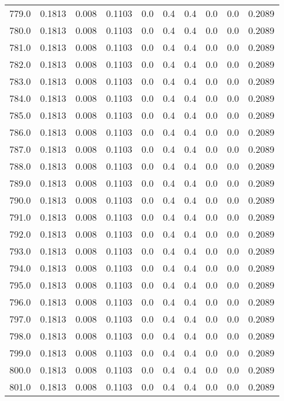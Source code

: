 \begin{longtable}{lrrrrrrrrr}
779.0 & 0.1813 & 0.008 & 0.1103 & 0.0 & 0.4 & 0.4 & 0.0 & 0.0 & 0.2089 \\
780.0 & 0.1813 & 0.008 & 0.1103 & 0.0 & 0.4 & 0.4 & 0.0 & 0.0 & 0.2089 \\
781.0 & 0.1813 & 0.008 & 0.1103 & 0.0 & 0.4 & 0.4 & 0.0 & 0.0 & 0.2089 \\
782.0 & 0.1813 & 0.008 & 0.1103 & 0.0 & 0.4 & 0.4 & 0.0 & 0.0 & 0.2089 \\
783.0 & 0.1813 & 0.008 & 0.1103 & 0.0 & 0.4 & 0.4 & 0.0 & 0.0 & 0.2089 \\
784.0 & 0.1813 & 0.008 & 0.1103 & 0.0 & 0.4 & 0.4 & 0.0 & 0.0 & 0.2089 \\
785.0 & 0.1813 & 0.008 & 0.1103 & 0.0 & 0.4 & 0.4 & 0.0 & 0.0 & 0.2089 \\
786.0 & 0.1813 & 0.008 & 0.1103 & 0.0 & 0.4 & 0.4 & 0.0 & 0.0 & 0.2089 \\
787.0 & 0.1813 & 0.008 & 0.1103 & 0.0 & 0.4 & 0.4 & 0.0 & 0.0 & 0.2089 \\
788.0 & 0.1813 & 0.008 & 0.1103 & 0.0 & 0.4 & 0.4 & 0.0 & 0.0 & 0.2089 \\
789.0 & 0.1813 & 0.008 & 0.1103 & 0.0 & 0.4 & 0.4 & 0.0 & 0.0 & 0.2089 \\
790.0 & 0.1813 & 0.008 & 0.1103 & 0.0 & 0.4 & 0.4 & 0.0 & 0.0 & 0.2089 \\
791.0 & 0.1813 & 0.008 & 0.1103 & 0.0 & 0.4 & 0.4 & 0.0 & 0.0 & 0.2089 \\
792.0 & 0.1813 & 0.008 & 0.1103 & 0.0 & 0.4 & 0.4 & 0.0 & 0.0 & 0.2089 \\
793.0 & 0.1813 & 0.008 & 0.1103 & 0.0 & 0.4 & 0.4 & 0.0 & 0.0 & 0.2089 \\
794.0 & 0.1813 & 0.008 & 0.1103 & 0.0 & 0.4 & 0.4 & 0.0 & 0.0 & 0.2089 \\
795.0 & 0.1813 & 0.008 & 0.1103 & 0.0 & 0.4 & 0.4 & 0.0 & 0.0 & 0.2089 \\
796.0 & 0.1813 & 0.008 & 0.1103 & 0.0 & 0.4 & 0.4 & 0.0 & 0.0 & 0.2089 \\
797.0 & 0.1813 & 0.008 & 0.1103 & 0.0 & 0.4 & 0.4 & 0.0 & 0.0 & 0.2089 \\
798.0 & 0.1813 & 0.008 & 0.1103 & 0.0 & 0.4 & 0.4 & 0.0 & 0.0 & 0.2089 \\
799.0 & 0.1813 & 0.008 & 0.1103 & 0.0 & 0.4 & 0.4 & 0.0 & 0.0 & 0.2089 \\
800.0 & 0.1813 & 0.008 & 0.1103 & 0.0 & 0.4 & 0.4 & 0.0 & 0.0 & 0.2089 \\
801.0 & 0.1813 & 0.008 & 0.1103 & 0.0 & 0.4 & 0.4 & 0.0 & 0.0 & 0.2089 \\

\end{longtable}
